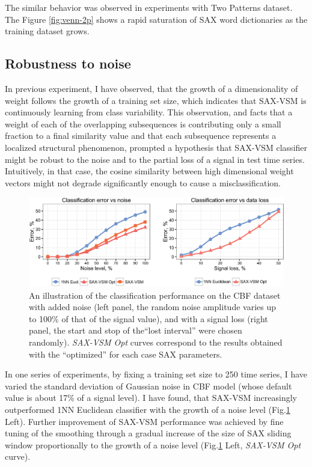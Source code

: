 The similar behavior was observed in experiments with Two Patterns dataset. The Figure \ref{fig:venn-2p} shows
a rapid saturation of SAX word dictionaries as the training dataset grows.


\subsection{Robustness to noise}
In previous experiment, I have observed, that the growth of a dimensionality of \tfidf weight follows the growth 
of a training set size, which indicates that SAX-VSM is continuously learning from class variability.
This observation, and facts that a weight of each of the overlapping subsequences is contributing only 
a small fraction to a final similarity value and that each subsequence represents a localized structural phenomenon,
prompted a hypothesis that SAX-VSM classifier might be robust to the noise and to the partial loss of a signal in
test time series. Intuitively, in that case, the cosine similarity between high dimensional weight vectors might 
not degrade significantly enough to cause a misclassification.

\begin{figure}[t]
  \centering
  \includegraphics[width=130mm]{figures/corrupted.eps}
  \caption{An illustration of the classification performance on the CBF dataset with added noise (left panel,
  the random noise amplitude varies up to 100\% of that of the signal value),
  and with a signal loss (right panel, the start and stop of the``lost interval'' were chosen randomly).
  \textit{SAX-VSM Opt} curves correspond to the results obtained with the ``optimized'' for each case 
  SAX parameters.}
  \label{fig:corrupted}
\end{figure}

In one series of experiments, by fixing a training set size to 250 time series, I have varied the standard deviation 
of Gaussian noise in CBF model (whose default value is about 17\% of a signal level). 
I have found, that SAX-VSM increasingly outperformed 1NN Euclidean classifier with the growth of a noise level 
(Fig.\ref{fig:corrupted} Left). 
Further improvement of SAX-VSM performance was achieved by fine tuning of the smoothing  
through a gradual increase of the size of SAX sliding window proportionally to the growth of 
a noise level (Fig.\ref{fig:corrupted} Left, \textit{SAX-VSM Opt} curve). 

